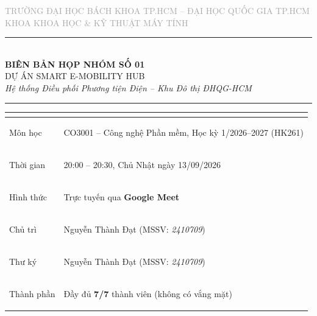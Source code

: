 \documentclass[11pt,a4paper]{article}
\begin{document}
\thispagestyle{fancy}

\begin{center}
  {\small\textcolor{darkgray}{TRƯỜNG ĐẠI HỌC BÁCH KHOA TP.HCM -- ĐẠI HỌC QUỐC GIA TP.HCM}}\\[2pt]
  {\small\textcolor{darkgray}{KHOA KHOA HỌC \& KỸ THUẬT MÁY TÍNH}}\\[2pt]
  \textcolor{hcmutblue}{\rule{0.6\textwidth}{1.2pt}}\\[10pt]
  {\LARGE\bfseries\textcolor{hcmutblue}{BIÊN BẢN HỌP NHÓM SỐ 01}}\\[5pt]
  {\Large\textcolor{sectionblue}{DỰ ÁN SMART E-MOBILITY HUB}}\\[3pt]
  {\normalsize\textit{Hệ thống Điều phối Phương tiện Điện -- Khu Đô thị ĐHQG-HCM}}\\[3pt]
  \textcolor{hcmutblue}{\rule{0.6\textwidth}{1.2pt}}
\end{center}

\vspace{4pt}

\begin{center}
\renewcommand{\arraystretch}{1.3}
\begin{tabularx}{\textwidth}{|>{\bfseries\raggedright\arraybackslash}p{3.8cm}|X|}
  \hline
  \rowcolor{lightgray} \multicolumn{2}{|c|}{\textbf{THÔNG TIN CUỘC HỌP}} \\
  \hline
  Môn học        & CO3001 -- Công nghệ Phần mềm, Học kỳ 1/2026--2027 (HK261) \\
  \hline
  Thời gian      & 20:00 -- 20:30, Chủ Nhật ngày 13/09/2026 \\
  \hline
  Hình thức      & Trực tuyến qua \textbf{Google Meet} \\
  \hline
  Chủ trì        & Nguyễn Thành Đạt (MSSV: \textit{2410709}) \\
  \hline
  Thư ký         & Nguyễn Thành Đạt (MSSV: \textit{2410709}) \\
  \hline
  Thành phần      & Đầy đủ \textbf{7/7} thành viên (không có vắng mặt) \\
  \hline
\end{tabularx}
\end{center}
\end{document}
